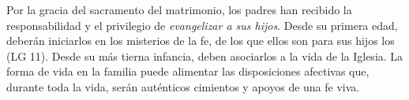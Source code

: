 	 Por la gracia del sacramento del matrimonio, los padres han recibido la responsabilidad y el privilegio de \emph{evangelizar a sus hijos}. Desde su primera edad, deberán iniciarlos en los misterios de la fe, de los que ellos son para sus hijos los  (LG 11). Desde su más tierna infancia, deben asociarlos a la vida de la Iglesia. La forma de vida en la familia puede alimentar las disposiciones afectivas que, durante toda la vida, serán auténticos cimientos y apoyos de una fe viva.